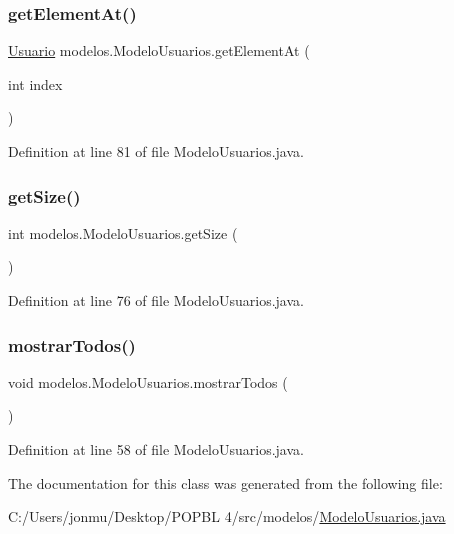 \subsubsection{\texorpdfstring{get\+Element\+At()}{getElementAt()}}
{\footnotesize\ttfamily \mbox{\hyperlink{classobjetos_1_1_usuario}{Usuario}} modelos.\+Modelo\+Usuarios.\+get\+Element\+At (\begin{DoxyParamCaption}\item[{int}]{index }\end{DoxyParamCaption})}



Definition at line 81 of file Modelo\+Usuarios.\+java.

\mbox{\label{classmodelos_1_1_modelo_usuarios_a35b3ac033cacc65073296b297d92eb0b}} 
\subsubsection{\texorpdfstring{get\+Size()}{getSize()}}
{\footnotesize\ttfamily int modelos.\+Modelo\+Usuarios.\+get\+Size (\begin{DoxyParamCaption}{ }\end{DoxyParamCaption})}



Definition at line 76 of file Modelo\+Usuarios.\+java.

\mbox{\label{classmodelos_1_1_modelo_usuarios_a319bbe3d654caccba263e75ae64e9f37}} 
\subsubsection{\texorpdfstring{mostrar\+Todos()}{mostrarTodos()}}
{\footnotesize\ttfamily void modelos.\+Modelo\+Usuarios.\+mostrar\+Todos (\begin{DoxyParamCaption}{ }\end{DoxyParamCaption})}



Definition at line 58 of file Modelo\+Usuarios.\+java.



The documentation for this class was generated from the following file\+:\begin{DoxyCompactItemize}
\item 
C\+:/\+Users/jonmu/\+Desktop/\+P\+O\+P\+B\+L 4/src/modelos/\mbox{\hyperlink{_modelo_usuarios_8java}{Modelo\+Usuarios.\+java}}\end{DoxyCompactItemize}
